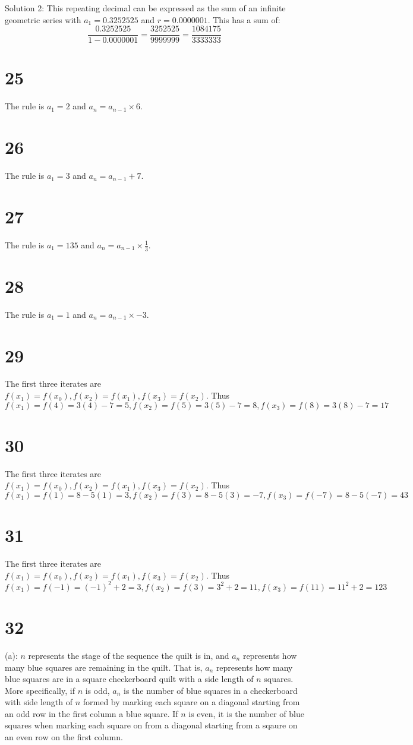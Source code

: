 \documentclass{article}
\theoremstyle{definition}
\newcommand{\?}{\stackrel{?}{=}}
\begin{document}
Solution 2: This repeating decimal can be expressed as the sum of an infinite geometric series with $a_1=0.3252525$ and $r=0.0000001$. This has a sum of:
\[ \frac{0.3252525}{1-0.0000001}=\frac{3252525}{9999999}=\frac{1084175}{3333333} \]

\section*{25}
The rule is $a_1=2$ and $a_n=a_{n-1}\times 6$.

\section*{26}
The rule is $a_1=3$ and $a_n=a_{n-1}+7$.

\section*{27}
The rule is $a_1=135$ and $a_n=a_{n-1}\times\frac{1}{3}$.

\section*{28}
The rule is $a_1=1$ and $a_n=a_{n-1}\times -3$.

\section*{29}
The first three iterates are $f(x_1)=f(x_0),f(x_2)=f(x_1),f(x_3)=f(x_2)$. Thus
\[ f(x_1)=f(4)=3(4)-7=5,f(x_2)=f(5)=3(5)-7=8,f(x_3)=f(8)=3(8)-7=17 \]

\section*{30}
The first three iterates are $f(x_1)=f(x_0),f(x_2)=f(x_1),f(x_3)=f(x_2)$. Thus
\[ f(x_1)=f(1)=8-5(1)=3,f(x_2)=f(3)=8-5(3)=-7,f(x_3)=f(-7)=8-5(-7)=43 \]

\section*{31}
The first three iterates are $f(x_1)=f(x_0),f(x_2)=f(x_1),f(x_3)=f(x_2)$. Thus
\[ f(x_1)=f(-1)=(-1)^2+2=3,f(x_2)=f(3)=3^2+2=11,f(x_3)=f(11)=11^2+2=123 \]

\section*{32}
(a): $n$ represents the stage of the sequence the quilt is in, and $a_n$ represents how many blue squares are remaining in the quilt. That is, $a_n$ represents how many blue squares are in 
a square checkerboard quilt with a side length of $n$ squares. More specifically, if $n$ is odd, $a_n$ is the number of blue squares in a checkerboard with side length of $n$ formed by 
marking each square on a diagonal starting from an odd row in the first column a blue square. If $n$ is even, it is the number of blue squares when marking each square on from a diagonal 
starting from a sqaure on an even row on the first column.
\end{document}
